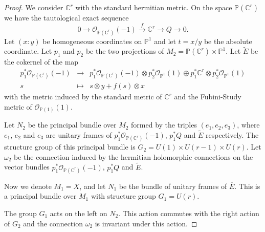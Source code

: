 \documentclass[10pt,twoside]{article}
\numberwithin{equation}{section}
\theoremstyle{plain}
\theoremstyle{definition}
\begin{document}
\begin{proof}
  We consider $\mathbb{C}^{r}$ with the standard hermitian metric. On
  the space $\mathbb{P}(\mathbb{C}^{r})$ we have the tautological
  exact sequence   
  \begin{displaymath}
    0\longrightarrow \mathcal{O}_{\mathbb{P}(\mathbb{C}^{r})}(-1)
    \overset{f}{\longrightarrow }\mathbb{C}^{r}\longrightarrow
    Q\longrightarrow 0. 
  \end{displaymath}
  Let $(x:y)$ be homogeneous coordinates on $\mathbb{P}^{1}$ and let
  $t=x/y$ be the absolute coordinate. Let $p_{1}$ and $p_{2}$ be the
  two projections of $M_{2}=\mathbb{P}(\mathbb{C}^{r})\times
  \mathbb{P}^{1}$. Let $\widetilde E$ be the cokernel of the map 
  \begin{displaymath}
    \begin{matrix}
    p_{1}^{\ast}\mathcal{O}_{\mathbb{P}(\mathbb{C}^{r})}(-1)&
    \longrightarrow       &
    p_{1}^{\ast}\mathcal{O}_{\mathbb{P}(\mathbb{C}^{r})}(-1)\otimes 
    p_{2}^{\ast}\mathcal{O}_{\mathbb{P}^{1}}(1)\oplus
    p_{1}^{\ast} \mathbb{C}^{r}\otimes
    p_{2}^{\ast}\mathcal{O}_{\mathbb{P}^{1}}(1) \\
    s & \longmapsto & s\otimes y + f(s)\otimes x
    \end{matrix}
  \end{displaymath}
  with the metric induced by the standard metric of $\mathbb{C}^{r}$
  and the Fubini-Study metric of $\mathcal{O}_{\mathbb{P}(1)}(1)$. 
  
  Let $N_{2}$ be the principal bundle over $M_{2}$ formed by the
  triples $(e_{1},e_{2},e_{3})$, where $e_{1}$, $e_{2}$ and $e_{3}$
  are unitary frames of 
  $p_{1}^{\ast}\mathcal{O}_{\mathbb{P}(\mathbb{C}^{r})}(-1)$,
  $p_{1}^{\ast} Q$ and $\widetilde E$ respectively. The structure
  group of this principal bundle is $G_{2}=U(1)\times U(r-1)\times
  U(r)$. Let $\omega _{2}$ be the connection induced by the hermitian
  holomorphic connections on the vector bundles
  $p_{1}^{\ast}\mathcal{O}_{\mathbb{P}(\mathbb{C}^{r})}(-1)$, 
  $p_{1}^{\ast} Q$ and $\widetilde E$. 

  Now we denote $M_{1}=X$, and let $N_{1}$ be the bundle of unitary
  frames of $\overline E$. This is a principal bundle over $M_{1}$
  with structure
  group $G_{1}=U(r)$.

  The group $G_{1}$ acts on the left on $N_{2}$. This action commutes
  with the right action of $G_{2}$ and the connection $\omega _{2}$ is
  invariant under this action.


\end{proof}
\end{document}

